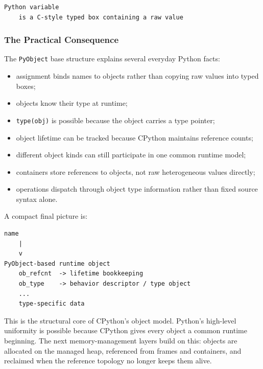\begin{verbatim}
Python variable
    is a C-style typed box containing a raw value
\end{verbatim}

\subsubsection*{The Practical Consequence}

The \texttt{PyObject} base structure explains several everyday Python facts:

\begin{itemize}
    \item assignment binds names to objects rather than copying raw values into typed boxes;
    \item objects know their type at runtime;
    \item \texttt{type(obj)} is possible because the object carries a type pointer;
    \item object lifetime can be tracked because CPython maintains reference counts;
    \item different object kinds can still participate in one common runtime model;
    \item containers store references to objects, not raw heterogeneous values directly;
    \item operations dispatch through object type information rather than fixed source syntax alone.
\end{itemize}

A compact final picture is:

\begin{verbatim}
name
    |
    v
PyObject-based runtime object
    ob_refcnt  -> lifetime bookkeeping
    ob_type    -> behavior descriptor / type object
    ...
    type-specific data
\end{verbatim}

This is the structural core of CPython's object model. Python's high-level uniformity is possible because CPython gives every object a common runtime beginning. The next memory-management layers build on this: objects are allocated on the managed heap, referenced from frames and containers, and reclaimed when the reference topology no longer keeps them alive.
